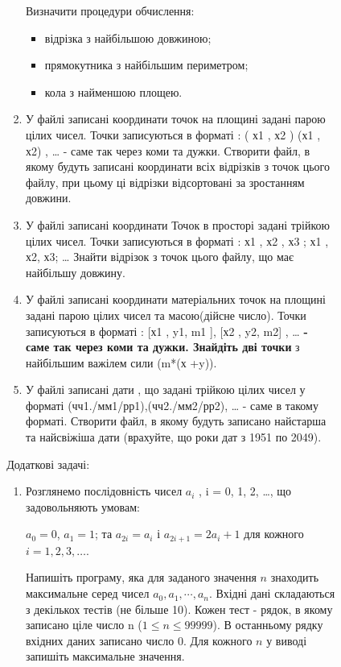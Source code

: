 \documentclass[]{article}
\makeatletter
\newcommand{\xslalph}[1]{\expandafter\@xslalph\csname c@#1\endcsname}
\newcommand{\@xslalph}[1]{%
    \ifcase#1\or а\or б\or в\or г\or д\or e\or є\or ж\or з\or i%
    \or й\or к\or л\or м\or н\or о\or п\or р\or с\or т%
    \or у\or ф\or х\or ц\or ч\or ш\or ю\or я\or аа\or бб\or вв%
    \else\@ctrerr\fi%
}
\makeatother
\begin{document}
\begin{enumerate}
\begin{enumerate}[label=\xslalph*)]
\begin{enumerate}
\begin{enumerate}[label=\xslalph*)]
\begin{enumerate}
Визначити процедури обчислення:
\begin{itemize}
\item відрізка з найбільшою довжиною;
\item прямокутника з найбільшим периметром;
\item кола з найменшою площею.
\end{itemize}


\item 
У файлі записані координати точок на площині задані парою цілих
чисел. Точки записуються в форматі : ( х1 , х2 ) (х1 , х2) , \ldots{} -
саме так через коми та дужки. Створити файл, в якому будуть записані
координати всіх відрізків з точок цього файлу, при цьому ці відрізки
відсортовані за зростанням довжини.

\item 
У файлі записані координати Точок в просторі задані трійкою цілих
чисел. Точки записуються в форматі : х1 , х2 , х3 ; х1 , х2, х3;
\ldots{} Знайти відрізок з точок цього файлу, що має найбільшу довжину.

\item 
У файлі записані координати матеріальних точок на площині задані
парою цілих чисел та масою(дійсне число). Точки записуються в форматі :
{[}х1 , y1, m1 {]}, {[}х2 , y2, m2{]} , \ldots{} \textbf{- саме так
через коми та дужки. Знайдіть дві точки} з найбільшим важілем сили (m*(х
+y)).

\item 
У файлі записані дати , що задані трійкою цілих чисел у форматі
(чч1./мм1/рр1),(чч2./мм2/рр2), \ldots{} - саме в такому форматі.
Створити файл, в якому будуть записано найстарша та найсвіжіша дати
(врахуйте, що роки дат з 1951 по 2049).

\end{enumerate}

Додаткові задачі:
\begin{enumerate}
\def\labelenumi{\arabic{enumi})}
\setcounter{enumi}{33}

\item  Розглянемо послідовність чисел \(a_{i}\) , i = 0, 1, 2, \ldots{}, що
задовольняють умовам:

\(a_{0} = 0\), \(a_{1} = 1\); та \(a_{2i} = a_{i}\) і
\(a_{2i + 1} = {2a}_{i} + 1\) для кожного $i = 1, 2, 3, \ldots{} $.

Напишіть програму, яка для заданого значення $n$ знаходить максимальне
серед чисел \(a_{0},a_{1},\cdots,a_{n}\). Вхідні дані складаються з
декількох тестів (не більше 10). Кожен тест - рядок, в якому записано
ціле число n ($1 \le n \le 99 999$). В останньому рядку вхідних даних записано
число 0. Для кожного $n$ у виводі запишіть максимальне значення.


\end{enumerate}
\end{enumerate}
\end{enumerate}
\end{enumerate}
\end{enumerate}
\end{document}
